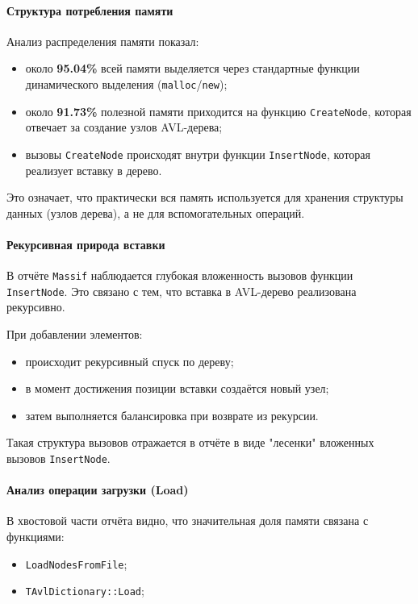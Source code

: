 \documentclass[12pt]{article}
\begin{document}
\paragraph{Структура потребления памяти}

Анализ распределения памяти показал:

\begin{itemize}
	\item около \textbf{95.04\%} всей памяти выделяется через стандартные функции динамического выделения (\texttt{malloc}/\texttt{new});
	\item около \textbf{91.73\%} полезной памяти приходится на функцию \texttt{CreateNode}, которая отвечает за создание узлов AVL-дерева;
	\item вызовы \texttt{CreateNode} происходят внутри функции \texttt{InsertNode}, которая реализует вставку в дерево.
\end{itemize}

Это означает, что практически вся память используется для хранения структуры данных (узлов дерева), а не для вспомогательных операций.

\paragraph{Рекурсивная природа вставки}

В отчёте \texttt{Massif} наблюдается глубокая вложенность вызовов функции \texttt{InsertNode}. Это связано с тем, что вставка в AVL-дерево реализована рекурсивно.

При добавлении элементов:
\begin{itemize}
	\item происходит рекурсивный спуск по дереву;
	\item в момент достижения позиции вставки создаётся новый узел;
	\item затем выполняется балансировка при возврате из рекурсии.
\end{itemize}

Такая структура вызовов отражается в отчёте в виде "лесенки" вложенных вызовов \texttt{InsertNode}.

\paragraph{Анализ операции загрузки (Load)}

В хвостовой части отчёта видно, что значительная доля памяти связана с функциями:

\begin{itemize}
	\item \texttt{LoadNodesFromFile};
	\item \texttt{TAvlDictionary::Load};
\end{itemize}
\end{document}

